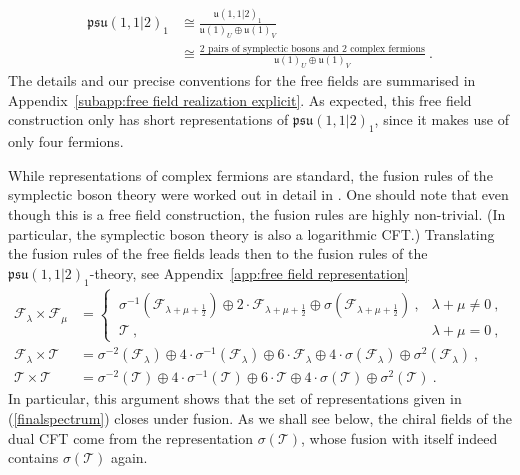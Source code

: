 \documentclass[12pt,a4paper]{article}
\begin{document}
\begin{align} 
\mathfrak{psu}(1,1|2)_1 &\cong \frac{\mathfrak{u}(1,1|2)_1}{\mathfrak{u}(1)_U \oplus \mathfrak{u}(1)_V} \\
&\cong \frac{\text{2 pairs of symplectic bosons and 2 complex fermions}}{\mathfrak{u}(1)_U \oplus \mathfrak{u}(1)_V}\ . \label{eq:free field representation}
\end{align}
The details and our precise conventions for the free fields are summarised in Appendix~\ref{subapp:free field realization explicit}. As expected, this free field construction only has short representations of $\mathfrak{psu}(1,1|2)_1$, since it makes use of only four fermions.

While representations of complex fermions are standard, the fusion rules of the symplectic boson theory were worked out in detail in \cite{Ridout:2010jk}. One should note that even though this is a free field construction, the fusion rules are highly non-trivial. (In particular, the symplectic boson theory is also a logarithmic CFT.)
Translating the fusion rules of the free fields leads then to the fusion rules of the $\mathfrak{psu}(1,1|2)_1$-theory, see Appendix~\ref{app:free field representation} 
\begin{subequations}
\begin{align}
\mathscr{F}_{\lambda} \times \mathscr{F}_{\mu}&=\begin{cases}
\ \sigma^{-1}(\mathscr{F}_{\lambda+\mu+\frac{1}{2}}) \oplus 2\cdot \mathscr{F}_{\lambda+\mu+\frac{1}{2}} \oplus \sigma(\mathscr{F}_{\lambda+\mu+\frac{1}{2}})\ , & \lambda+\mu\ne 0\ , \\
\ \mathscr{T}\ , & \lambda+\mu=0\ ,
\end{cases} \label{eq:psu112 fusion rules a}\\
\mathscr{F}_\lambda \times \mathscr{T} &=\sigma^{-2}(\mathscr{F}_\lambda) \oplus 4\cdot \sigma^{-1}(\mathscr{F}_\lambda)\oplus 6\cdot \mathscr{F}_\lambda \oplus 4\cdot \sigma(\mathscr{F}_\lambda)\oplus \sigma^{2}(\mathscr{F}_\lambda)\ , \label{eq:psu112 fusion rules b}\\
\mathscr{T} \times \mathscr{T} &= \sigma^{-2}(\mathscr{T}) \oplus 4\cdot \sigma^{-1}(\mathscr{T})\oplus 6\cdot \mathscr{T}\oplus 4 \cdot \sigma(\mathscr{T}) \oplus \sigma^{2}(\mathscr{T})\ .\label{eq:psu112 fusion rules c}
\end{align}
\end{subequations}
In particular, this argument shows that the set of representations given in (\ref{finalspectrum}) closes under fusion. 
As we shall see below, the chiral fields of the dual CFT come from the representation $\sigma(\mathscr{T})$, whose fusion with itself indeed contains $\sigma(\mathscr{T})$ again.
\end{document}
